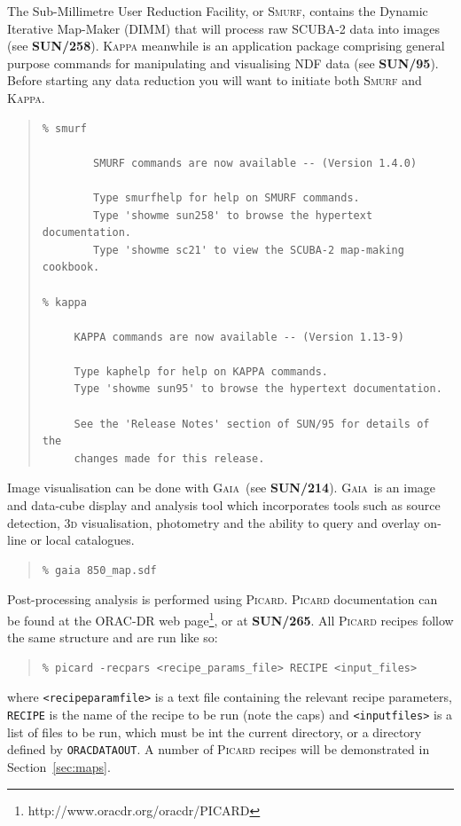 \documentclass[twoside,11pt]{article}
\newcommand{\htmladdnormallinkfoot}[2]{#1\footnote{#2}}
\newcommand{\htmlref}[2]{#1}
\newcommand{\latexhtml}[2]{#1}
\newcommand{\xref}[3]{#1}
\renewcommand{\_}{\texttt{\symbol{95}}}
\newenvironment{myquote}{\begin{quote}\begin{small}}{\end{small}\end{quote}}
\newcommand{\gaia}{\xref{\textsc{Gaia}}{sun214}{}}
\newcommand{\param}[1]{\texttt{#1}}
\newcommand{\gaiasun}{\xref{\textbf{SUN/214}}{sun214}{}}
\newcommand{\kappasun}{\xref{\textbf{SUN/95}}{sun95}{}}
\newcommand{\picardsun}{\xref{\textbf{SUN/265}}{sun265}{}}
\newcommand{\smurfsun}{\xref{\textbf{SUN/258}}{sun258}{}}
\newcommand{\cref}[3]{\latexhtml{#1~\ref{#2}}{\htmlref{#3}{#2}}}
\begin{document}
The Sub-Millimetre User Reduction Facility, or \textsc{Smurf}, contains the
Dynamic Iterative Map-Maker (DIMM) that will process raw SCUBA-2 data
into images (see \smurfsun). \textsc{Kappa} meanwhile is an application
package comprising general purpose commands for manipulating and
visualising NDF data (see \kappasun). Before starting any data
reduction you will want to initiate both \textsc{Smurf} and \textsc{Kappa}.
\begin{myquote}
\begin{verbatim}
% smurf

        SMURF commands are now available -- (Version 1.4.0)

        Type smurfhelp for help on SMURF commands.
        Type 'showme sun258' to browse the hypertext documentation.
        Type 'showme sc21' to view the SCUBA-2 map-making cookbook.

% kappa

     KAPPA commands are now available -- (Version 1.13-9)

     Type kaphelp for help on KAPPA commands.
     Type 'showme sun95' to browse the hypertext documentation.

     See the 'Release Notes' section of SUN/95 for details of the
     changes made for this release.
\end{verbatim}
\end{myquote}
Image visualisation can be done with \gaia\ (see \gaiasun). \gaia\ is an
image and data-cube display and analysis tool which incorporates tools such
as source detection, 3\textsc{d} visualisation, photometry and the ability
to query and overlay on-line or local catalogues.
\begin{myquote}
\begin{verbatim}
% gaia 850_map.sdf
\end{verbatim}
\end{myquote}

Post-processing analysis is performed using \textsc{Picard}. \textsc{Picard} documentation can be
found at \htmladdnormallinkfoot{the ORAC-DR web page}{http://www.oracdr.org/oracdr/PICARD},
or at \picardsun. All \textsc{Picard} recipes follow the same structure and are run like so:
\begin{myquote}
\begin{verbatim}
% picard -recpars <recipe_params_file> RECIPE <input_files>
\end{verbatim}
\end{myquote}
where \param{<recipe\_param\_file>} is a text file containing the
relevant recipe parameters, \param{RECIPE} is the name of the recipe
to be run (note the caps) and \param{<input\_files>} is a list of
files to be run, which must be int the current directory, or a
directory defined by \param{ORAC\_DATA\_OUT}. A number of \textsc{Picard}
recipes will be demonstrated in \cref{Section}{sec:maps}{Reducing your data}.
\end{document}
